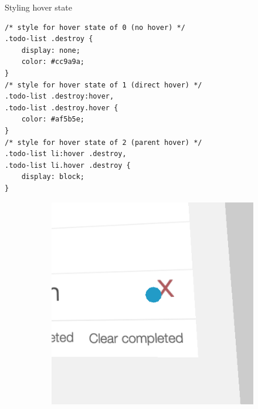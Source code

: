 \documentclass[sigconf]{acmart}
\begin{document}
\begin{listing}[H]
\caption{Styling hover state}
\label{listing:styles-hover}
\begin{verbatim}
/* style for hover state of 0 (no hover) */               
.todo-list .destroy {
	display: none;
	color: #cc9a9a;
}
/* style for hover state of 1 (direct hover) */
.todo-list .destroy:hover, 
.todo-list .destroy.hover {
	color: #af5b5e;
}
/* style for hover state of 2 (parent hover) */
.todo-list li:hover .destroy, 
.todo-list li.hover .destroy {
	display: block;
}
\end{verbatim}
\end{listing}

\begin{figure}[H]
  \centering
    \begin{subfigure}{0.48\linewidth}
    \centering
    \includegraphics[trim={16px 30px 0 30px},clip, width=\linewidth]{TodoMVC-Hover-1.png}
    \end{subfigure}
    \begin{subfigure}{0.48\linewidth}
    \centering

\end{subfigure}
\end{figure}
\end{document}

